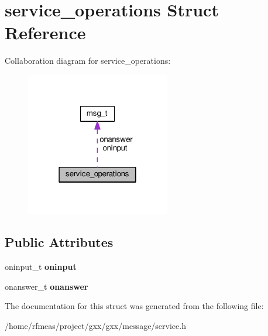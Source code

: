 \hypertarget{structservice__operations}{}\section{service\+\_\+operations Struct Reference}
\label{structservice__operations}


Collaboration diagram for service\+\_\+operations\+:
\nopagebreak
\begin{figure}[H]
\begin{center}
\leavevmode
\includegraphics[width=178pt]{structservice__operations__coll__graph}
\end{center}
\end{figure}
\subsection*{Public Attributes}
\begin{DoxyCompactItemize}
\item 
oninput\+\_\+t {\bfseries oninput}\hypertarget{structservice__operations_aaa53a43768a59bb5029d56e4d509ad9e}{}\label{structservice__operations_aaa53a43768a59bb5029d56e4d509ad9e}

\item 
onanswer\+\_\+t {\bfseries onanswer}\hypertarget{structservice__operations_a668054fa6cf8950033cfe60067ed5049}{}\label{structservice__operations_a668054fa6cf8950033cfe60067ed5049}

\end{DoxyCompactItemize}


The documentation for this struct was generated from the following file\+:\begin{DoxyCompactItemize}
\item 
/home/rfmeas/project/gxx/gxx/message/service.\+h\end{DoxyCompactItemize}
